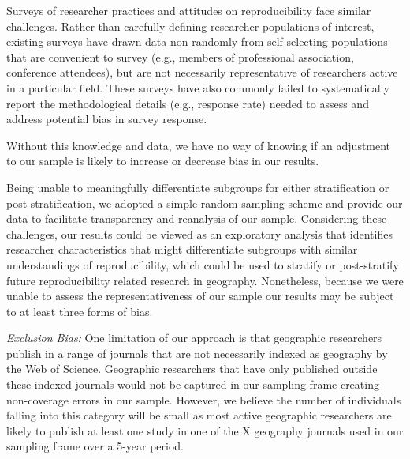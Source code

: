 Surveys of researcher practices and attitudes on reproducibility face similar challenges. 
Rather than carefully defining researcher populations of interest, existing surveys have drawn data non-randomly from self-selecting populations that are convenient to survey (e.g., members of professional association, conference attendees), but are not necessarily representative of researchers active in a particular field. 
These surveys have also commonly failed to systematically report the methodological details (e.g., response rate) needed to assess and address potential bias in survey response. 


Without this knowledge and data, we have no way of knowing if an adjustment to our sample is likely to increase or decrease bias in our results.   

Being unable to meaningfully differentiate subgroups for either stratification or post-stratification, we adopted a simple random sampling scheme and provide our data to facilitate transparency and reanalysis of our sample.
Considering these challenges, our results could be viewed as an exploratory analysis that identifies researcher characteristics that might differentiate subgroups with similar understandings of reproducibility, which could be used to stratify or post-stratify future reproducibility related research in geography.
Nonetheless, because we were unable to assess the representativeness of our sample our results may be subject to at least three forms of bias. 

\textit{Exclusion Bias:} One limitation of our approach is that geographic researchers publish in a range of journals that are not necessarily indexed as geography by the Web of Science. 
Geographic researchers that have only published outside these indexed journals would not be captured in our sampling frame creating non-coverage errors in our sample. 
However, we believe the number of individuals falling into this category will be small as most active geographic researchers are likely to publish at least one study in one of the X geography journals used in our sampling frame over a 5-year period.

